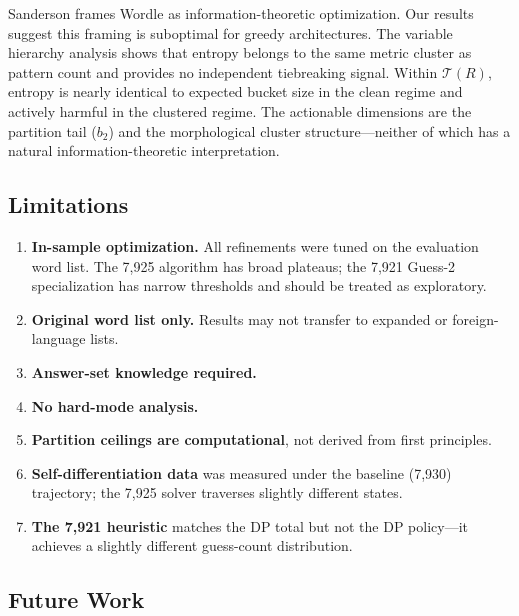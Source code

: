 \documentclass[11pt]{article}
\begin{document}
	Sanderson \cite{sanderson2022a} frames Wordle as information-theoretic optimization.  Our results suggest this framing is suboptimal for greedy architectures.  The variable hierarchy analysis shows that entropy belongs to the same metric cluster as pattern count and provides no independent tiebreaking signal.  Within $\mathcal{T}(R)$, entropy is nearly identical to expected bucket size in the clean regime and actively harmful in the clustered regime.  The actionable dimensions are the partition tail ($b_2$) and the morphological cluster structure---neither of which has a natural information-theoretic interpretation.
	
	\subsection{Limitations}
	
	\begin{enumerate}[nosep]
		\item \textbf{In-sample optimization.}  All refinements were tuned on the evaluation word list.  The 7,925 algorithm has broad plateaus; the 7,921 Guess-2 specialization has narrow thresholds and should be treated as exploratory.
		\item \textbf{Original word list only.}  Results may not transfer to expanded or foreign-language lists.
		\item \textbf{Answer-set knowledge required.}
		\item \textbf{No hard-mode analysis.}
		\item \textbf{Partition ceilings are computational}, not derived from first principles.
		\item \textbf{Self-differentiation data} was measured under the baseline (7,930) trajectory; the 7,925 solver traverses slightly different states.
		\item \textbf{The 7,921 heuristic} matches the DP total but not the DP policy---it achieves a slightly different guess-count distribution.
	\end{enumerate}
	
	\subsection{Future Work}
	
\end{document}
